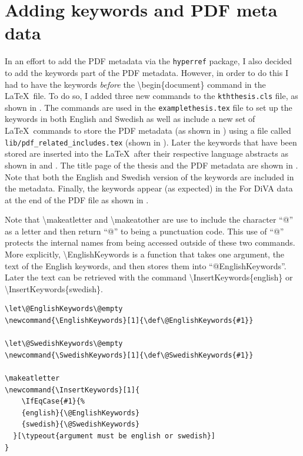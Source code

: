 \section{Adding keywords and PDF meta data}
\label{sec:addingKeywordsAndMetaDataToPDF}
In an effort to add the PDF metadata via the \texttt{hyperref} package, I also decided to add the keywords part of the PDF metadata. However, in order to do this I had to have the keywords \textit{before} the \textbackslash begin\{document\} command in the \LaTeX~file. To do so, I added three new commands to the \texttt{kththesis.cls} file, as shown in . The commands are used in the \texttt{examplethesis.tex} file to set up the keywords in both English and Swedish as well as include a new set of \LaTeX~commands to store the PDF metadata (as shown in ) using a file called \texttt{lib/pdf\_related\_includes.tex} (shown in ). Later the keywords that have been stored are inserted into the \LaTeX~after their respective language abstracts as shown in  and . The title page of the thesis and the PDF metadata are shown in . Note that both the English and Swedish version of the keywords are included in the metadata. Finally, the keywords appear (as expected) in the For DiVA data at the end of the PDF file as shown in .

Note that \textbackslash makeatletter and \textbackslash makeatother are use to include the character “@” as a letter and then return “@” to being a punctuation code. This use of “@” protects the internal names from being accessed outside of these two commands. More explicitly, \textbackslash EnglishKeywords is a function that takes one argument, the text of the English keywords, and then stores them into “@EnglishKeywords”. Later the text can be retrieved with the command \textbackslash InsertKeywords\{english\} or \textbackslash InsertKeywords\{swedish\}.
\begin{lstlisting}[language={[LaTeX]TeX}, caption={New commands in kththesis.cls}, label=lst:keywords]
% Keywords
\let\@EnglishKeywords\@empty
\newcommand{\EnglishKeywords}[1]{\def\@EnglishKeywords{#1}}

\let\@SwedishKeywords\@empty
\newcommand{\SwedishKeywords}[1]{\def\@SwedishKeywords{#1}}

\makeatletter
\newcommand{\InsertKeywords}[1]{
    \IfEqCase{#1}{%
    {english}{\@EnglishKeywords}
    {swedish}{\@SwedishKeywords}
  }[\typeout{argument must be english or swedish}]
}
\end{lstlisting}

